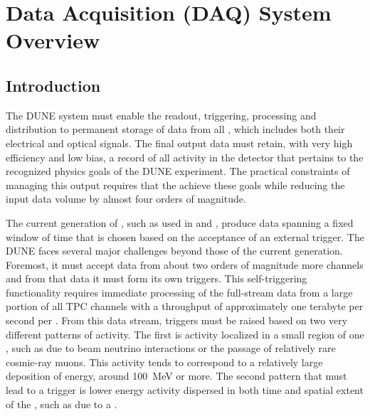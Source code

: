 \section{Data Acquisition (DAQ) System Overview}
\label{sec:fd-daq-ov}


\subsection{Introduction}
\label{sec:fd-daq-intro}

The DUNE   system must enable the readout,
triggering, processing and distribution to permanent storage of data
from all , which includes both their electrical
 and optical  signals.  
The final output data must retain, with very high efficiency and low
bias, a record of all activity in the detector that pertains to the
recognized physics goals of the DUNE experiment. 
The practical constraints of managing this output requires that the
 achieve these goals while reducing the input data volume by almost four
orders of magnitude.

The current generation of  , such as used in
 and \microboone, produce data spanning a fixed window of
time that is chosen based on the acceptance of an external trigger. 
The DUNE  faces several major challenges beyond those of the
current generation. 
Foremost, it must accept data from about two orders of magnitude more
channels and from that data it must form its own triggers.
This self-triggering functionality requires immediate processing of
the full-stream data from a large portion of all TPC channels with a
throughput of approximately one terabyte per second per
. 
From this data stream, triggers must be raised based on two very
different patterns of activity. 
The first is activity %
localized in a small region of one
, such as due to beam neutrino interactions or the
passage of relatively rare cosmic-ray muons. 
This activity tends to correspond to a relatively large deposition of
energy, around \SI{100}{\MeV} or more. 
The second pattern that must lead to a trigger is lower energy activity
dispersed in both time and spatial extent of the , such as due to a 
.

